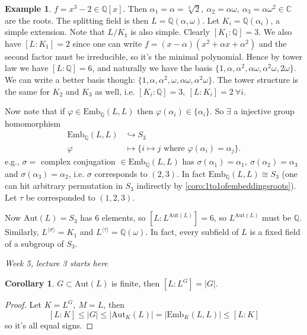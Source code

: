 \documentclass[a4paper]{article}
\newcommand{\Q}{\mathbb Q}
\newcommand{\C}{\mathbb C}
\newcommand{\Aut}{\text{Aut}}
\newcommand{\emb}{\text{Emb}}
\theoremstyle{definition}
\newtheorem{coro}[defn]{Corollary}
\newtheorem{example}[defn]{Example}
\begin{document}
\begin{example}
$f=x^3-2\in\Q[x]$. Then $\alpha_1=\alpha=\sqrt[3]2,\ \alpha_2=\alpha\omega,\ \alpha_3=\alpha\omega^2\in\C$ are the roots. The splitting field is then $L=\Q(\alpha,\omega)$. Let $K_i=\Q(\alpha_i)$, a simple extension. Note that $L/K_1$ is also simple. Clearly $[K_1:\Q]=3$. We also have $[L:K_1]=2$ since one can write $f=(x-\alpha)(x^2+\alpha x+\alpha^2)$ and the second factor must be irreducible, so it's the minimal polynomial. Hence by tower law we have $[L:\Q]=6$, and naturally we have the basis $\{1,\alpha,\alpha^2,\alpha\omega,\alpha^2\omega,2\omega\}$. We can write a better basis though: $\{1,\alpha,\alpha^2,\omega,\alpha\omega,\alpha^2\omega\}$. The tower structure is the same for $K_2$ and $K_3$ as well, i.e. $[K_i:\Q]=3,\ [L:K_i]=2 \ \forall i$.

Now note that if $\varphi\in\emb_{\Q}(L,L)$ then $\varphi(\alpha_i)\in\{\alpha_i\}$. So $\exists$ a injective group homomorphism
\[
\begin{aligned}
\emb_{\Q}(L,L) &\hookrightarrow S_3 \\
\varphi &\mapsto \{i\mapsto j \text{ where }\varphi(\alpha_i)=\alpha_j\}.
\end{aligned}
\]
e.g., $\sigma=$ complex conjugation $\in\emb_{\Q}(L,L)$ has $\sigma(\alpha_1)=\alpha_1,\ \sigma(\alpha_2)=\alpha_3$ and $\sigma(\alpha_3)=\alpha_2$, i.e. $\sigma$ corresponds to $(2,3)$. In fact $\emb_{\Q}(L,L)\cong S_3$ (one can hit arbitrary permutation in $S_3$ indirectly by \ref{coro:1to1ofembeddingsroots}). Let $\tau$ be corresponded to $(1,2,3)$.

Now $\Aut(L)=S_3$ has 6 elements, so $[L:L^{\Aut(L)}]=6$, so $L^{\Aut(L)}$ must be $\Q$. Similarly, $L^{\langle\sigma\rangle}=K_1$ and $L^{\langle\tau\rangle}=\Q(\omega)$. In fact, every subfield of $L$ is a fixed field of a subgroup of $S_3$.
\end{example}


\begin{flushright}
\textit{Week 5, lecture 3 starts here}
\end{flushright}

\begin{coro}
\label{coro:degreeequalsizeofG}
$G\subset \Aut(L)$ is finite, then $[L:L^G]=|G|$.
\end{coro}
\begin{proof}
Let $K=L^G,\ M=L$, then
\[
[L:K]\leq |G| \leq |\Aut_K(L)| = |\emb_K(L,L)| \leq [L:K]
\]
so it's all equal signs.
\end{proof}
\end{document}
